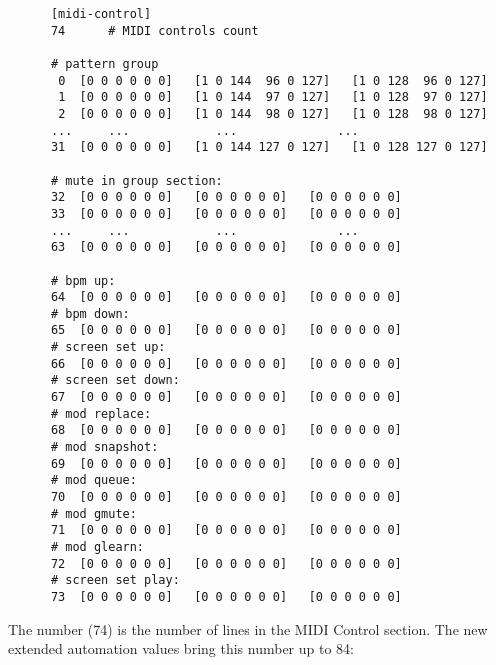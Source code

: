    \begin{verbatim}
      [midi-control]
      74      # MIDI controls count

      # pattern group
       0  [0 0 0 0 0 0]   [1 0 144  96 0 127]   [1 0 128  96 0 127]            
       1  [0 0 0 0 0 0]   [1 0 144  97 0 127]   [1 0 128  97 0 127]            
       2  [0 0 0 0 0 0]   [1 0 144  98 0 127]   [1 0 128  98 0 127]            
      ...     ...            ...              ...
      31  [0 0 0 0 0 0]   [1 0 144 127 0 127]   [1 0 128 127 0 127]            

      # mute in group section:
      32  [0 0 0 0 0 0]   [0 0 0 0 0 0]   [0 0 0 0 0 0]   
      33  [0 0 0 0 0 0]   [0 0 0 0 0 0]   [0 0 0 0 0 0]   
      ...     ...            ...              ...
      63  [0 0 0 0 0 0]   [0 0 0 0 0 0]   [0 0 0 0 0 0]   

      # bpm up:
      64  [0 0 0 0 0 0]   [0 0 0 0 0 0]   [0 0 0 0 0 0]   
      # bpm down:
      65  [0 0 0 0 0 0]   [0 0 0 0 0 0]   [0 0 0 0 0 0]   
      # screen set up:
      66  [0 0 0 0 0 0]   [0 0 0 0 0 0]   [0 0 0 0 0 0]   
      # screen set down:
      67  [0 0 0 0 0 0]   [0 0 0 0 0 0]   [0 0 0 0 0 0]   
      # mod replace:
      68  [0 0 0 0 0 0]   [0 0 0 0 0 0]   [0 0 0 0 0 0]   
      # mod snapshot:
      69  [0 0 0 0 0 0]   [0 0 0 0 0 0]   [0 0 0 0 0 0]   
      # mod queue:
      70  [0 0 0 0 0 0]   [0 0 0 0 0 0]   [0 0 0 0 0 0]   
      # mod gmute:
      71  [0 0 0 0 0 0]   [0 0 0 0 0 0]   [0 0 0 0 0 0]   
      # mod glearn:
      72  [0 0 0 0 0 0]   [0 0 0 0 0 0]   [0 0 0 0 0 0]   
      # screen set play:
      73  [0 0 0 0 0 0]   [0 0 0 0 0 0]   [0 0 0 0 0 0]   
   \end{verbatim}

   The number (74) is the number of lines in the MIDI Control section.
   The new extended automation values bring this number up to 84:

